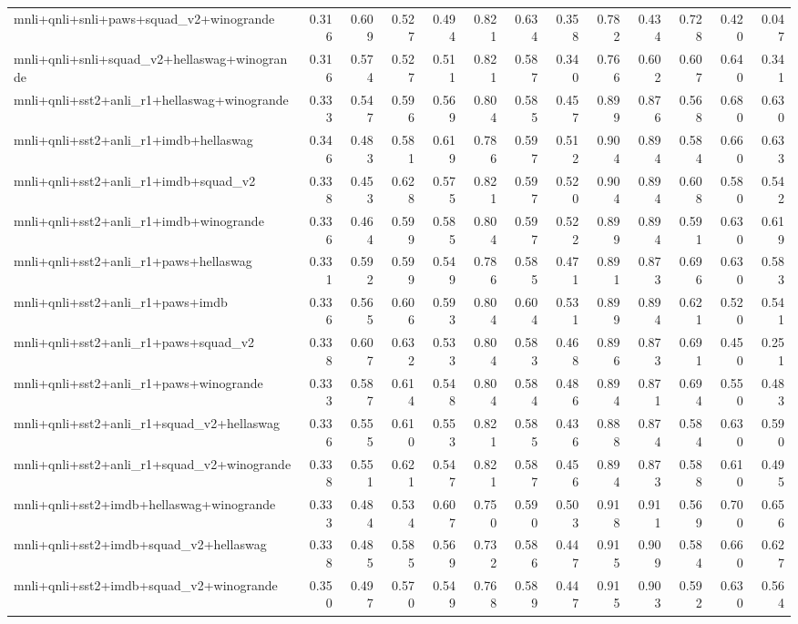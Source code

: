 \begin{table}[t]
\begin{tabular}{lrrrrrrrrrrrr}
    mnli+qnli+snli+paws+squad\_v2+winogrande & 0.316 & 0.609 & 0.527 & 0.494 & 0.821 & 0.634 & 0.358 & 0.782 & 0.434 & 0.728 & 0.420 & 0.047 \\
    mnli+qnli+snli+squad\_v2+hellaswag+winogrande & 0.316 & 0.574 & 0.527 & 0.511 & 0.821 & 0.587 & 0.340 & 0.766 & 0.602 & 0.607 & 0.640 & 0.341 \\
    mnli+qnli+sst2+anli\_r1+hellaswag+winogrande & 0.333 & 0.547 & 0.596 & 0.569 & 0.804 & 0.585 & 0.457 & 0.899 & 0.876 & 0.568 & 0.680 & 0.630 \\
    mnli+qnli+sst2+anli\_r1+imdb+hellaswag & 0.346 & 0.483 & 0.581 & 0.619 & 0.786 & 0.597 & 0.512 & 0.904 & 0.894 & 0.584 & 0.660 & 0.633 \\
    mnli+qnli+sst2+anli\_r1+imdb+squad\_v2 & 0.338 & 0.453 & 0.628 & 0.575 & 0.821 & 0.597 & 0.520 & 0.904 & 0.894 & 0.608 & 0.580 & 0.542 \\
    mnli+qnli+sst2+anli\_r1+imdb+winogrande & 0.336 & 0.464 & 0.599 & 0.585 & 0.804 & 0.597 & 0.522 & 0.899 & 0.894 & 0.591 & 0.630 & 0.619 \\
    mnli+qnli+sst2+anli\_r1+paws+hellaswag & 0.331 & 0.592 & 0.599 & 0.549 & 0.786 & 0.585 & 0.471 & 0.891 & 0.873 & 0.696 & 0.630 & 0.583 \\
    mnli+qnli+sst2+anli\_r1+paws+imdb & 0.336 & 0.565 & 0.606 & 0.593 & 0.804 & 0.604 & 0.531 & 0.899 & 0.894 & 0.621 & 0.520 & 0.541 \\
    mnli+qnli+sst2+anli\_r1+paws+squad\_v2 & 0.338 & 0.607 & 0.632 & 0.533 & 0.804 & 0.583 & 0.468 & 0.896 & 0.873 & 0.691 & 0.450 & 0.251 \\
    mnli+qnli+sst2+anli\_r1+paws+winogrande & 0.333 & 0.587 & 0.614 & 0.548 & 0.804 & 0.584 & 0.486 & 0.894 & 0.871 & 0.694 & 0.550 & 0.483 \\
    mnli+qnli+sst2+anli\_r1+squad\_v2+hellaswag & 0.336 & 0.555 & 0.610 & 0.553 & 0.821 & 0.585 & 0.436 & 0.888 & 0.874 & 0.584 & 0.630 & 0.590 \\
    mnli+qnli+sst2+anli\_r1+squad\_v2+winogrande & 0.338 & 0.551 & 0.621 & 0.547 & 0.821 & 0.587 & 0.456 & 0.894 & 0.873 & 0.588 & 0.610 & 0.495 \\
    mnli+qnli+sst2+imdb+hellaswag+winogrande & 0.333 & 0.484 & 0.534 & 0.607 & 0.750 & 0.590 & 0.503 & 0.918 & 0.911 & 0.569 & 0.700 & 0.656 \\
    mnli+qnli+sst2+imdb+squad\_v2+hellaswag & 0.338 & 0.485 & 0.585 & 0.569 & 0.732 & 0.586 & 0.447 & 0.915 & 0.909 & 0.584 & 0.660 & 0.627 \\
    mnli+qnli+sst2+imdb+squad\_v2+winogrande & 0.350 & 0.497 & 0.570 & 0.549 & 0.768 & 0.589 & 0.447 & 0.915 & 0.903 & 0.592 & 0.630 & 0.564 \\

\end{tabular}
\end{table}
